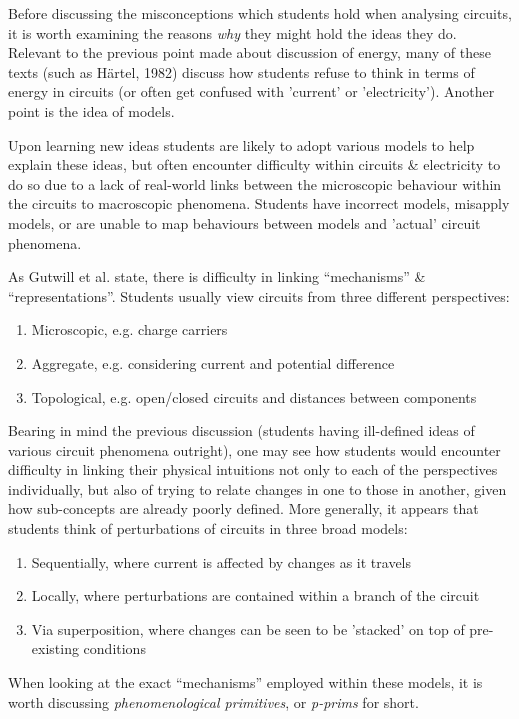 \documentclass[a4paper,openany,nobib]{tufte-book}
\begin{document}
Before discussing the misconceptions which students hold when analysing circuits, it is worth examining the reasons \emph{why} they might hold the ideas they do.
Relevant to the previous point made about discussion of energy, many of these texts (such as Härtel, 1982) discuss how students refuse to think in terms of energy in circuits (or often get confused with 'current' or 'electricity').
Another point is the idea of models.

Upon learning new ideas students are likely to adopt various models to help explain these {ideas\autocite{bagno2000}}, but often encounter difficulty within circuits \& electricity to do so due to a lack of real-world links between the microscopic behaviour within the circuits to macroscopic phenomena. Students have incorrect models, misapply models, or are unable to map behaviours between models and 'actual' circuit phenomena.

As Gutwill et al. state, there is difficulty in linking ``mechanisms'' \& {``representations''\autocite{gutwill99}}.
Students usually view circuits from three different perspectives:
\begin{enumerate}
	\item Microscopic, e.g. charge carriers
	\item Aggregate, e.g. considering current and potential difference
	\item Topological, e.g. open/closed circuits and distances between components
\end{enumerate}
Bearing in mind the previous discussion (students having ill-defined ideas of various circuit phenomena outright), one may see how students would encounter difficulty in linking their physical intuitions not only to each of the perspectives individually, but also of trying to relate changes in one to those in another, given how sub-concepts are already poorly defined. More generally, it appears that students think of perturbations of circuits in three broad {models\autocite{ates2005}}:
\begin{enumerate}
	\item Sequentially, where current is affected by changes as it travels
	\item Locally, where perturbations are contained within a branch of the circuit
	\item Via superposition, where changes can be seen to be 'stacked' on top of pre-existing conditions
\end{enumerate}
When looking at the exact ``mechanisms'' employed within these models, it is worth discussing \emph{phenomenological primitives}, or \emph{p-prims} for {short\autocite{prim}}. 
\end{document}
